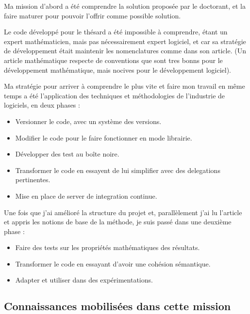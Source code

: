 \documentclass{resume} %
\begin{document}
		Ma mission d'abord a été comprendre la solution proposée par le doctorant, et la faire maturer pour pouvoir l'offrir comme possible solution.  
		
		Le code développé pour le thésard  a été impossible à comprendre,  étant un expert mathématicien, mais pas nécessairement expert logiciel, et car sa stratégie  de développement était maintenir les nomenclatures comme dans son article. (Un article mathématique respecte de conventions que sont tres bonns pour le développement mathématique, mais nocives pour le développement logiciel). 
		
		Ma stratégie pour arriver à comprendre le plus vite et faire mon travail en même temps a été l'application des techniques et méthodologies de l'industrie de logiciels, en deux phases : 
		
		\begin{itemize}
				\item Versionner le code, avec un système des versions.
				\item Modifier le code pour le faire fonctionner en mode librairie. 
				\item Développer des test au boîte noire.
				\item Transformer le code en essayent de lui simplifier avec des delegations pertinentes. 
				\item Mise en place de server de integration continue.
		\end {itemize}

		Une fois que j'ai amélioré la structure du projet et, parallèlement j'ai lu l'article et appris les notions de base de la méthode, je suis  passé dans une deuxième phase :
	
		\begin{itemize}
				\item Faire des tests sur les propriétés mathématiques des résultats.
				\item Transformer le code en essayant d'avoir une cohésion sémantique.
				\item Adapter et utiliser dans des expérimentations.
		\end {itemize}

	
	\subsection {Connaissances mobilisées dans cette mission }
	
\end{document}
